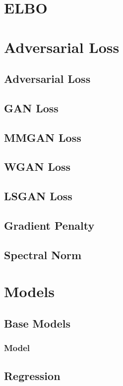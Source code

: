 \documentclass{article}
\begin{document}
\section{ELBO}


\section{Adversarial Loss}
\subsection{Adversarial Loss}
\subsection{GAN Loss}
\subsection{MMGAN Loss}
\subsection{WGAN Loss}
\subsection{LSGAN Loss}
\subsection{Gradient Penalty}
\subsection{Spectral Norm}


\section{Models}
\subsection{Base Models}
\subsubsection{Model}

\subsection{Regression}
\end{document}

